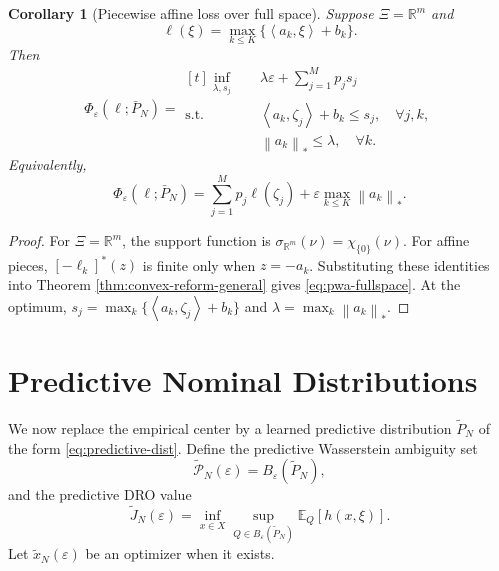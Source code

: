 \documentclass[11pt]{article}
\newtheorem{corollary}[theorem]{Corollary}
\newcommand{\R}{\mathbb{R}}
\newcommand{\E}{\mathbb{E}}
\newcommand{\cP}{\mathcal{P}}
\newcommand{\XiSet}{\Xi}
\newcommand{\1}{\mathbf{1}}
\newcommand{\Ptil}{\widetilde P_N}
\newcommand{\Pbar}{\bar P_N}
\newcommand{\inner}[2]{\left\langle #1,#2\right\rangle}
\newcommand{\norm}[1]{\left\lVert #1\right\rVert}
\begin{document}
\begin{corollary}[Piecewise affine loss over full space]\label{cor:pwa-fullspace}
Suppose $\XiSet=\R^m$ and
\begin{equation}
    \ell(\xi)=\max_{k\le K}\{\inner{a_k}{\xi}+b_k\}.
\end{equation}
Then
\begin{equation}\label{eq:pwa-fullspace}
\Phi_\varepsilon(\ell;\Pbar)=
\begin{aligned}[t]
\inf_{\lambda,s_j}\quad
&\lambda\varepsilon+\sum_{j=1}^Mp_js_j\\
\mathrm{s.t.}\quad
&\inner{a_k}{\zeta_j}+b_k\le s_j,\quad \forall j,k,\\
&\norm{a_k}_*\le\lambda,
\quad \forall k.
\end{aligned}
\end{equation}
Equivalently,
\begin{equation}
    \Phi_\varepsilon(\ell;\Pbar)=\sum_{j=1}^Mp_j\ell(\zeta_j)+\varepsilon\max_{k\le K}\norm{a_k}_*.
\end{equation}
\end{corollary}

\begin{proof}
For $\XiSet=\R^m$, the support function is $\sigma_{\R^m}(\nu)=\chi_{\{0\}}(\nu)$. For affine pieces, $[-\ell_k]^*(z)$ is finite only when $z=-a_k$. Substituting these identities into Theorem \ref{thm:convex-reform-general} gives \eqref{eq:pwa-fullspace}. At the optimum, $s_j=\max_k\{\inner{a_k}{\zeta_j}+b_k\}$ and $\lambda=\max_k\norm{a_k}_*$.
\end{proof}

\section{Predictive Nominal Distributions}\label{sec:predictive-dist}

We now replace the empirical center by a learned predictive distribution $\Ptil$ of the form \eqref{eq:predictive-dist}. Define the predictive Wasserstein ambiguity set
\begin{equation}
    \widetilde{\cP}_N(\varepsilon)=B_\varepsilon(\Ptil),
\end{equation}
and the predictive DRO value
\begin{equation}\label{eq:pred-dro}
    \widetilde J_N(\varepsilon)=\inf_{x\in X}\sup_{Q\in B_\varepsilon(\Ptil)}\E_Q[h(x,\xi)].
\end{equation}
Let $\widetilde x_N(\varepsilon)$ be an optimizer when it exists.
\end{document}
